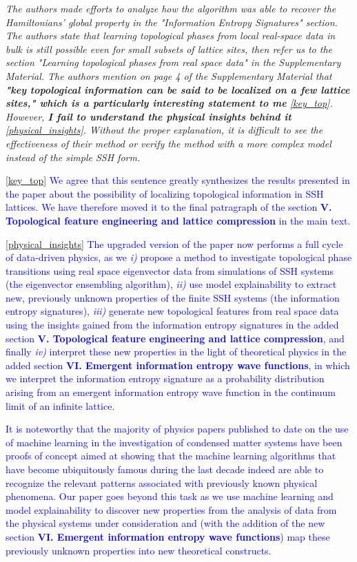 \documentclass[10pt]{revtex4-1}
\newcounter{quoter}
\newcommand{\genquote}[1]{\refstepcounter{quoter} \label{#1} \ref{#1}}
\newcommand{\citequote}[1]{\ref{#1}}
\begin{document}
\vspace{0.5cm}
\emph{The authors made efforts to analyze how the algorithm was able to recover the Hamiltonians' global property in the "Information Entropy
Signatures" section. The authors state that learning topological phases from local real-space data in bulk is still possible even for
small subsets of lattice sites, then refer us to the section "Learning topological phases from real space data" in the Supplementary
Material. The authors mention on page 4 of the Supplementary Material that \textbf{"key topological information can be said to be localized on a few lattice sites," which is a particularly interesting statement to me}\genquote{key_top}. However, \textbf{I fail to understand the physical insights behind it}\genquote{physical_insights}. Without the proper explanation, it is difficult to see the effectiveness of
their method or verify the method with a more complex model instead of the simple SSH form.}

\vspace{0.25cm}
\textcolor{blue}{\citequote{key_top} We agree that this sentence greatly synthesizes the results presented in the paper about the possibility of localizing topological information in SSH lattices. We have therefore moved it to the final patragraph of the section \textbf{V. Topological feature engineering and lattice compression} in the main text.}

\textcolor{blue}{\citequote{physical_insights} The upgraded version of the paper now performs a full cycle of data-driven physics, as we \emph{i)} propose a method to investigate topological phase transitions using real space eigenvector data from simulations of SSH systems (the eigenvector ensembling algorithm), \emph{ii)} use model explainability to extract new, previously unknown properties of the finite SSH systems (the information entropy signatures), \emph{iii)} generate new topological features from real space data using the insights gained from the information entropy signatures in the added section \textbf{V. Topological feature engineering and lattice compression},  and finally \emph{iv)} interpret these new properties in the light of theoretical physics in the added section \textbf{VI. Emergent information entropy wave functions}, in which we interpret the information entropy signature as a probability distribution arising from an emergent information entropy wave function in the continuum limit of an infinite lattice.}

\textcolor{blue}{It is noteworthy that the majority of physics papers published to date on the use of machine learning in the investigation of condensed matter systems have been proofs of concept aimed at showing that the machine learning algorithms that have become ubiquitously famous during the last decade indeed are able to recognize the relevant patterns associated with previously known physical phenomena. Our paper goes beyond this task as we use machine learning and model explainability to discover new properties from the analysis of data from the physical systems under consideration and (with the addition of the new section \textbf{VI. Emergent information entropy wave functions}) map these previously unknown properties into new theoretical  constructs.}
\end{document}

